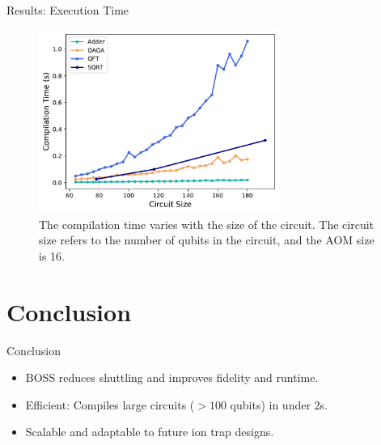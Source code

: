 \documentclass{beamer}
\begin{document}
	\begin{frame}{Results: Execution Time}
		\begin{figure}
			\centering
			\includegraphics[width=0.7\textwidth]{figure/scalability1.pdf}
			\caption{The compilation time varies with the size of the circuit. The circuit size refers to the number of qubits in the circuit, and the AOM size is 16.}
		\end{figure}
	\end{frame}
	
	\section{Conclusion}
	\begin{frame}{Conclusion}
		\begin{itemize}
			\item BOSS reduces shuttling and improves fidelity and runtime.
			\item Efficient: Compiles large circuits ($>100$ qubits) in under 2s.
			\item Scalable and adaptable to future ion trap designs.
		\end{itemize}
	\end{frame}
	
\end{document}
